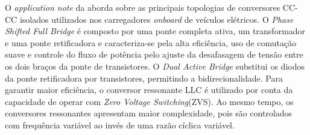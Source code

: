 O \textit{application note} da \cite{Infineon_CoolMOS_CFD7A} aborda sobre as principais
topologias de conversores CC-CC isolados utilizados nos carregadores \textit{onboard} de
veículos elétricos. O \textit{Phase Shifted Full Bridge} é composto por uma ponte completa
ativa, um transformador e uma ponte retificadora e caracteriza-se pela alta eficiência, uso de
comutação suave e controle do fluxo de potência pelo ajuste da desafasagem de tensão entre os
dois braços da ponte de transistores. O \textit{Dual Active Bridge} substitui os diodos da
ponte retificadora por transistores, permitindo a bidirecionalidade. Para garantir maior
eficiência, o conversor ressonante LLC é utilizado por conta da capacidade de operar com
\textit{Zero Voltage Switching}(ZVS). Ao mesmo tempo, os conversores ressonantes apresentam
maior complexidade, pois são controlados com frequência variável ao invés de uma razão cíclica
variável.

